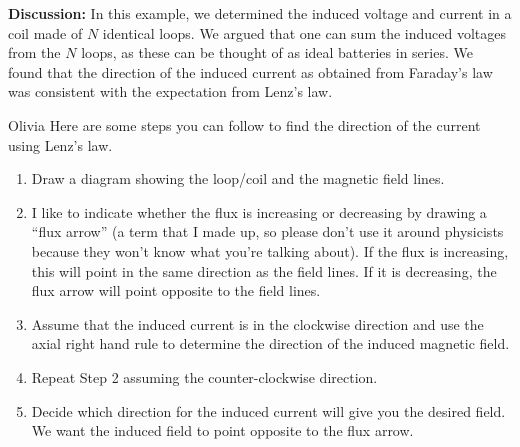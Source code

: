 \begin{example}
\textbf{Discussion: }In this example, we determined the induced voltage and current in a coil made of $N$ identical loops. We argued that one can sum the induced voltages from the $N$ loops, as these can be thought of as ideal batteries in series. We found that the direction of the induced current as obtained from Faraday's law was consistent with the expectation from Lenz's law.
\end{example}

\begin{studentOpinion}{Olivia}
Here are some steps you can follow to find the direction of the current using Lenz's law.
\begin{enumerate}
\item  Draw a diagram showing the loop/coil and the magnetic field lines. 
\item I like to indicate whether the flux is increasing or decreasing by drawing a ``flux arrow'' (a term that I made up, so please don't use it around physicists because they won't know what you're talking about). If the flux is increasing, this will point in the same direction as the field lines. If it is decreasing, the flux arrow will point opposite to the field lines. 
\item Assume that the induced current is in the clockwise direction and use the axial right hand rule to determine the direction of the induced magnetic field. 
\item Repeat Step 2 assuming the counter-clockwise direction.
\item Decide which direction for the induced current will give you the desired field. We want the induced field to point opposite to the flux arrow. 
\end{enumerate}  


\end{studentOpinion}
